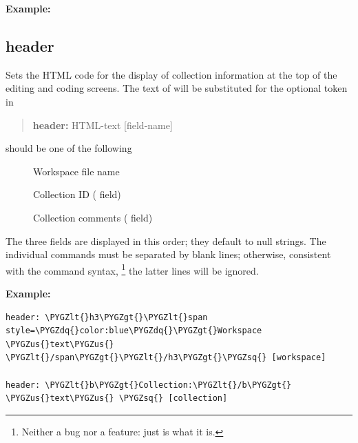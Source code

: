 \documentclass[letterpaper,10pt,english]{sphinxmanual}
\def\PYGZus{\char`\_}
\def\PYGZlt{\char`\<}
\def\PYGZgt{\char`\>}
\def\PYGZsq{\char`\'}
\def\PYGZdq{\char`\"}
\renewcommand\PYGZsq{\textquotesingle}
\begin{document}
\textbf{Example:}
\begin{quote}

\end{quote}


\subsection{header}
\label{forms:header}
Sets the HTML code for the display of collection information at the
top of the editing and coding screens. The text of  will
be substituted for the optional token  in 
\begin{quote}

\begin{DUlineblock}{0em}
\item[] \textbf{header:} HTML-text {[}field-name{]}
\end{DUlineblock}
\end{quote}

 should be one of the following
\begin{description}
\item[{}] \leavevmode
Workspace file name

\item[{}] \leavevmode
Collection ID ( field)

\item[{}] \leavevmode
Collection comments ( field)

\end{description}

The three fields are displayed in this order; they default to null strings.
The individual  commands must be separated by blank lines; otherwise,
consistent with the command syntax, \footnote{
Neither a bug nor a feature: just is what it is.
} the latter lines will be ignored.

\textbf{Example:}

\begin{Verbatim}[commandchars=\\\{\}]
header: \PYGZlt{}h3\PYGZgt{}\PYGZlt{}span style=\PYGZdq{}color:blue\PYGZdq{}\PYGZgt{}Workspace \PYGZus{}text\PYGZus{} \PYGZlt{}/span\PYGZgt{}\PYGZlt{}/h3\PYGZgt{}\PYGZsq{} [workspace]

header: \PYGZlt{}b\PYGZgt{}Collection:\PYGZlt{}/b\PYGZgt{} \PYGZus{}text\PYGZus{} \PYGZsq{} [collection]
\end{Verbatim}
\end{document}
